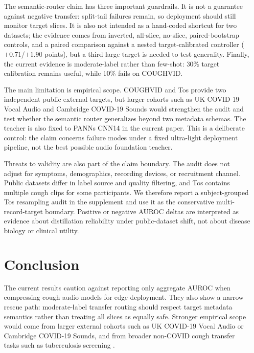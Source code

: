 \documentclass{article}
\begin{document}
The semantic-router claim has three important guardrails. It is not a guarantee against negative transfer: split-tail failures remain, so deployment should still monitor target slices. It is also not intended as a hand-coded shortcut for two datasets; the evidence comes from inverted, all-slice, no-slice, paired-bootstrap controls, and a paired comparison against a nested target-calibrated controller ($+0.71$/$+1.90$ points), but a third large target is needed to test generality. Finally, the current evidence is moderate-label rather than few-shot: 30\% target calibration remains useful, while 10\% fails on COUGHVID.

The main limitation is empirical scope. COUGHVID and Tos provide two independent public external targets, but larger cohorts such as UK COVID-19 Vocal Audio and Cambridge COVID-19 Sounds would strengthen the audit and test whether the semantic router generalizes beyond two metadata schemas. The teacher is also fixed to PANNs CNN14 in the current paper. This is a deliberate control: the claim concerns failure modes under a fixed ultra-light deployment pipeline, not the best possible audio foundation teacher.

Threats to validity are also part of the claim boundary. The audit does not adjust for symptoms, demographics, recording devices, or recruitment channel. Public datasets differ in label source and quality filtering, and Tos contains multiple cough clips for some participants. We therefore report a subject-grouped Tos resampling audit in the supplement and use it as the conservative multi-record-target boundary. Positive or negative AUROC deltas are interpreted as evidence about distillation reliability under public-dataset shift, not about disease biology or clinical utility.

\section{Conclusion}

The current results caution against reporting only aggregate AUROC when compressing cough audio models for edge deployment. They also show a narrow rescue path: moderate-label transfer routing should respect target metadata semantics rather than treating all slices as equally safe. Stronger empirical scope would come from larger external cohorts such as UK COVID-19 Vocal Audio or Cambridge COVID-19 Sounds, and from broader non-COVID cough transfer tasks such as tuberculosis screening \cite{kafentzis2026tb}.



\end{document}
